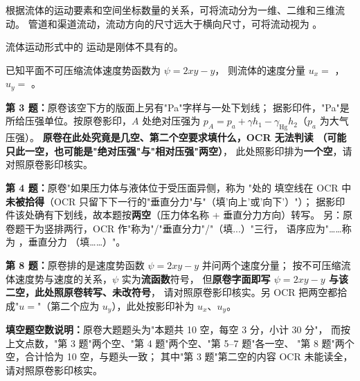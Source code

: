 \begin{ti}
  \item 根据流体的运动要素和空间坐标数量的关系，可将流动分为一维、二维和三维流动。
  管道和渠道流动，流动方向的尺寸远大于横向尺寸，可将流动视为 \underline{\hspace{3cm}}。
  \hfill{}

  \item 流体运动形式中的 \underline{\hspace{3cm}} 运动是刚体不具有的。\hfill{}

  \item 已知平面不可压缩流体速度势函数为 \(\psi=2xy-y\)，
  则流体的速度分量 \(u_x=\) \underline{\hspace{2.5cm}}，
  \(u_y=\) \underline{\hspace{2.5cm}}。\hfill{}
\end{ti}

\begin{tishi}
\textbf{第 3 题：}原卷该空下方的版面上另有"Pa"字样与一处下划线；
据影印件，"Pa"是所给压强单位。按原卷影印，\(A\) 处绝对压强为
\(p_A=p_a+\gamma h_1-\gamma_{\mathrm{Hg}}h_2\)（\(p_a\) 为大气压强）。
\textbf{原卷在此处究竟是几空、第二个空要求填什么，OCR 无法判读
（可能只此一空，也可能是"绝对压强"与"相对压强"两空）}，
此处照影印排为\textbf{一个空}，请对照原卷影印核实。

\textbf{第 4 题：}原卷"如果压力体与液体位于受压面异侧，称为 \underline{\hspace{1.5cm}}"处的
填空线在 OCR 中\textbf{未被拾得}（OCR 只留下下一行的"垂直分力"与"（填'向上'或'向下'）"）；
据影印件该处确有下划线，故本题按\textbf{两空}（压力体名称 + 垂直分力方向）转写。
另：原卷题干为竖排两行，OCR 作"称为"/"垂直分力"/"（填...）"三行，
语序应为"……称为 \underline{\hspace{1cm}}，垂直分力 \underline{\hspace{1cm}}（填……）"。

\textbf{第 8 题：}原卷排的是速度势函数 \(\psi=2xy-y\) 并问两个速度分量；
按不可压缩流体速度势与速度的关系，\(\psi\) 实为\textbf{流函数}符号，
但\textbf{原卷字面即写 \(\psi=2xy-y\) 与该二空，此处照原卷转写、未改符号}，
请对照原卷影印核实。另 OCR 把两空都拾成"\(u=\)"（第二个应为 \(u_y\)），此处按影印补为 \(u_x\)、\(u_y\)。

\textbf{填空题空数说明：}原卷大题题头为"本题共 10 空，每空 3 分，小计 30 分"，
而按上文点数，"第 3 题"两个空、"第 4 题"两个空、"第 5--7 题"各一空、
"第 8 题"两个空，合计恰为 10 空，与题头一致；
其中"第 3 题"第二空的内容 OCR 未能读全，请对照原卷影印核实。
\end{tishi}

